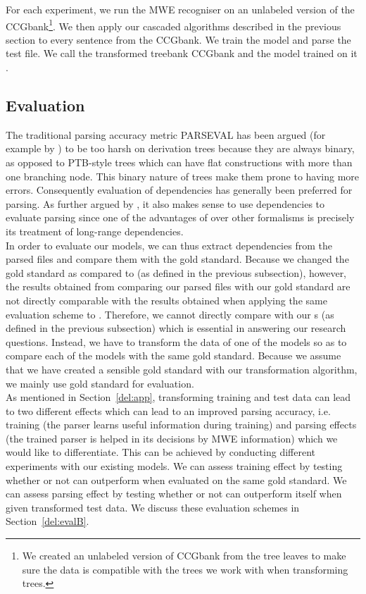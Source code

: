 \documentclass[output=paper]{langsci/langscibook}
\begin{document}
    For each experiment, we run the MWE recogniser on an unlabeled version of the CCGbank\footnote{We created an unlabeled version of CCGbank from the tree leaves to make sure the data is compatible with the trees we work with when transforming trees.}. We then apply our cascaded algorithms described in the previous section to every sentence from the CCGbank. We train the model and parse the test file. We call the transformed treebank CCGbank and the model trained on it {\modelB}.

    \subsection{Evaluation}
    \label{del:sec:eval}
    \indent The traditional parsing accuracy metric PARSEVAL has been argued (for example  by \citet{clark2002evaluating}) to be too harsh on  derivation trees because they are always binary, as opposed to PTB-style trees which can have flat constructions with more than one branching node. This binary nature of  trees make them prone to having more errors. Consequently evaluation of dependencies has generally been preferred for  parsing. As further argued by \citet{clark2002evaluating}, it also makes sense to use dependencies to evaluate  parsing since one of the advantages of  over other formalisms is precisely its treatment of long-range dependencies.\\
    \indent In order to evaluate our models, we can thus extract dependencies from the parsed files and compare them with the gold standard. Because we changed the gold standard as compared to {\modelA} (as defined in the previous subsection), however, the results obtained from comparing our parsed files with our gold standard are not directly comparable with the results obtained when applying the same evaluation scheme to {\modelA}. Therefore, we cannot directly compare {\modelA} with our {\modelB}s (as defined in the previous subsection) which is essential in answering our research questions. Instead, we have to transform the data of one of the models so as to compare each of the models with the same gold standard. Because we assume that we have created a sensible gold standard with our transformation algorithm, we mainly use gold standard for evaluation. \\
    \indent As mentioned in Section~\ref{del:app}, transforming training and test data can lead to two different effects which can lead to an improved parsing accuracy, i.e. training (the parser learns useful information during training) and parsing effects (the trained parser is helped in its decisions by MWE information) which we would like to differentiate. This can be achieved by conducting different experiments with our existing models. We can assess training effect by testing whether or not {\modelB} can outperform {\modelA} when evaluated on the same gold standard. We can assess parsing effect by testing whether or not {\modelA} can outperform itself when given transformed test data. We discuss these evaluation schemes in Section~\ref{del:evalB}. \\
\end{document}
